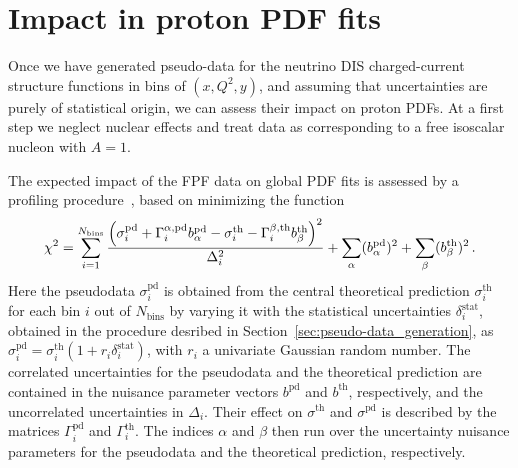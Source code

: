 \documentclass[11pt,a4paper]{article}
\def\frac#1#2{{{#1}\over {#2}}}
\numberwithin{equation}{section}
\numberwithin{figure}{section}
\numberwithin{table}{section}
\begin{document}
{\section{Impact in proton PDF fits}

Once we have generated pseudo-data for the 
neutrino DIS charged-current structure functions
in bins of $(x,Q^2,y)$, and assuming that uncertainties
are purely of statistical origin, we can assess their
impact on proton PDFs.
%
At a first step we neglect nuclear effects
and treat data as corresponding to a free isoscalar
nucleon with $A=1$.

The expected impact of the FPF data on global PDF fits is assessed by a profiling procedure~\cite{Paukkunen:2014zia, Schmidt:2018hvu, AbdulKhalek:2018rok, HERAFitterdevelopersTeam:2015cre}, based on minimizing the function
\begin{equation}
\chi^2 = 
\sum_{i=1}^{N_{\textrm{bins}}} 
\frac{\left(  \sigma_i^{\textrm{pd}}
            + \Gamma_i^{\alpha,\textrm{pd}}
              b_\alpha^{\textrm{pd}}
            - \sigma_i^{\textrm{th}}
            - \Gamma_i^{\beta,\textrm{th}}
              b_\beta^{\textrm{th}}
     \right)^2
     }{\Delta_i^2}
+ \sum_\alpha (b_\alpha^{\textrm{pd}})^2
+ \sum_\beta  (b_\beta^{\textrm{th}})^2 \, .
\label{eq:profilingchi2}
\end{equation}
Here the pseudodata 
$\sigma_i^{\textrm{pd}}$ 
is obtained from the central theoretical prediction 
$\sigma_i^{\textrm{th}}$ 
for each bin $i$ out of $N_{\textrm{bins}}$ by varying it with the statistical uncertainties 
$\delta_i^{\textrm{stat}}$, 
obtained in the procedure desribed in Section~\ref{sec:pseudo-data_generation}, 
as 
$\sigma_i^{\textrm{pd}} = \sigma_i^{\textrm{th}}(1 + r_i \delta_i^{\textrm{stat}})$, 
with $r_i$ a univariate Gaussian random number.
%
The correlated uncertainties for the pseudodata and the theoretical prediction 
are contained in the nuisance parameter vectors $b^{\textrm{pd}}$ and $b^{\textrm{th}}$, respectively, and the uncorrelated uncertainties in $\Delta_i$.
%
Their effect on $\sigma^{\textrm{th}}$ and $\sigma^{\textrm{pd}}$
is described by the matrices $\Gamma_i^{\textrm{pd}}$ and $\Gamma_i^{\textrm{th}}$.
The indices $\alpha$ and $\beta$ then run over the uncertainty nuisance parameters for the pseudodata and the theoretical prediction, respectively.
}
\end{document}
